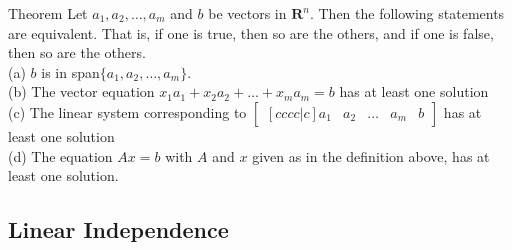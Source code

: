         \begin{theorem}{Theorem}
            Let $a_1, a_2, \dots, a_m$ and $b$ be vectors in $\mathbf{R}^n$. Then the following statements are equivalent. That is, if one is true, then so are the others, and if one is false, then so are the others. \\
            (a) $b$ is in span$\{a_1, a_2, \dots, a_m\}$. \\
            (b) The vector equation $x_1 a_1 + x_2 a_2 + \dots + x_m a_m = b$ has at least one solution \\
            (c) The linear system corresponding to $\begin{bmatrix}[cccc|c]a_1 & a_2 & \dots & a_m & b\end{bmatrix}$ has at least one solution \\
            (d) The equation $Ax = b$ with $A$ and $x$ given as in the definition above, has at least one solution.
        \end{theorem}

    \subsection{Linear Independence}